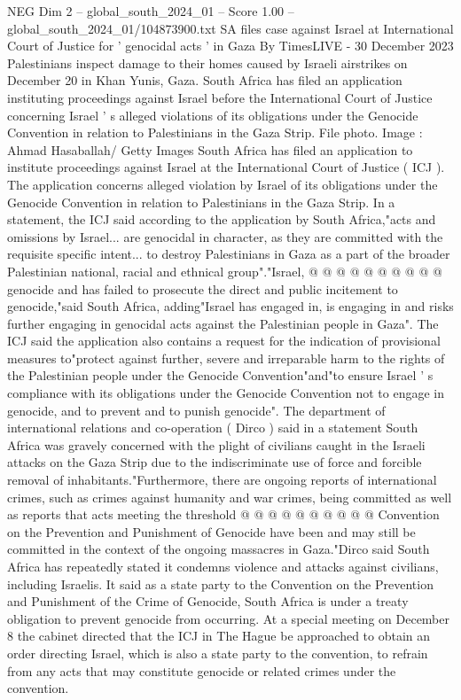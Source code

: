\begin{textsample}{NEG Dim 2 – global\_south\_2024\_01 – Score 1.00 – global\_south\_2024\_01/104873900.txt}  \label{ex:f2_neg_353}
SA files case against Israel at International Court of Justice for ' genocidal acts ' in Gaza By TimesLIVE - 30 December 2023 Palestinians inspect damage to their homes caused by Israeli airstrikes on December 20 in Khan Yunis, Gaza.
South Africa has filed an application instituting proceedings against Israel before the International Court of Justice concerning Israel ' s alleged violations of its obligations under the Genocide Convention in relation to Palestinians in the Gaza Strip.
File photo.
Image : Ahmad Hasaballah/ Getty Images South Africa has filed an application to institute proceedings against Israel at the International Court of Justice ( ICJ ).
The application concerns alleged violation by Israel of its obligations under the Genocide Convention in relation to Palestinians in the Gaza Strip.
In a statement, the ICJ said according to the application by South Africa,"acts and omissions by Israel... are genocidal in character, as they are committed with the requisite specific intent... to destroy Palestinians in Gaza as a part of the broader Palestinian national, racial and ethnical group"."Israel, @ @ @ @ @ @ @ @ @ @ genocide and has failed to prosecute the direct and public incitement to genocide,"said South Africa, adding"Israel has engaged in, is engaging in and risks further engaging in genocidal acts against the Palestinian people in Gaza".
The ICJ said the application also contains a request for the indication of provisional measures to"protect against further, severe and irreparable harm to the rights of the Palestinian people under the Genocide Convention"and"to ensure Israel ' s compliance with its obligations under the Genocide Convention not to engage in genocide, and to prevent and to punish genocide".
The department of international relations and co-operation ( Dirco ) said in a statement South Africa was gravely concerned with the plight of civilians caught in the Israeli attacks on the Gaza Strip due to the indiscriminate use of force and forcible removal of inhabitants."Furthermore, there are ongoing reports of international crimes, such as crimes against humanity and war crimes, being committed as well as reports that acts meeting the threshold @ @ @ @ @ @ @ @ @ @ Convention on the Prevention and Punishment of Genocide have been and may still be committed in the context of the ongoing massacres in Gaza."Dirco said South Africa has repeatedly stated it condemns violence and attacks against civilians, including Israelis.
It said as a state party to the Convention on the Prevention and Punishment of the Crime of Genocide, South Africa is under a treaty obligation to prevent genocide from occurring.
At a special meeting on December 8 the cabinet directed that the ICJ in The Hague be approached to obtain an order directing Israel, which is also a state party to the convention, to refrain from any acts that may constitute genocide or related crimes under the convention.

\end{textsample}
